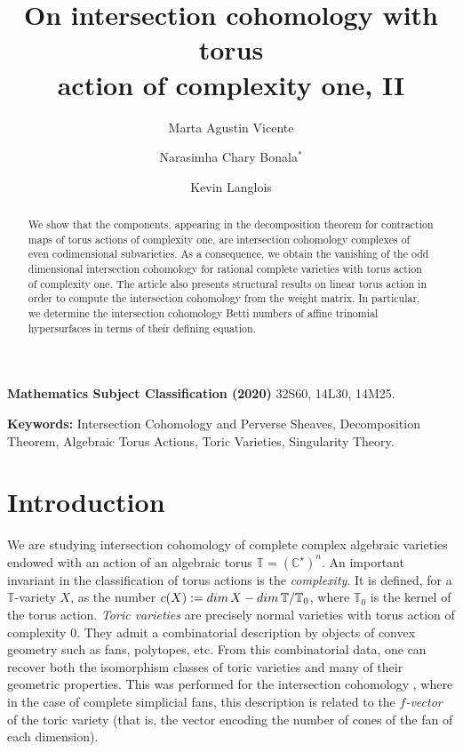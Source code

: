 \documentclass[11pt, reqno]{amsart}
\author[]{Marta Agustin Vicente}
\author[]{Narasimha Chary Bonala$^\ast$}
\author[]{Kevin Langlois}
\title []%
{On intersection cohomology with torus \\  action of complexity one, II}
\theoremstyle{plain}
\theoremstyle{definition}
\theoremstyle{remark}
\begin{document}
\begin{abstract}
We show that the components, appearing in the decomposition theorem for contraction maps of torus actions of complexity one, are intersection cohomology complexes  of even codimensional subvarieties.
 As a consequence, we obtain the vanishing of the odd dimensional intersection cohomology for rational complete varieties with torus action of complexity one. The article also presents structural results on linear torus action in order to
 compute the intersection cohomology from the weight matrix. In particular, we determine the intersection cohomology Betti numbers of affine trinomial hypersurfaces in terms of their defining equation. 
\end{abstract}  

\maketitle

{\bf Mathematics Subject Classification (2020) } 32S60, 14L30, 14M25.

\vspace{0.5cm}

{\bf Keywords:} Intersection Cohomology and Perverse Sheaves, Decomposition Theorem, Algebraic Torus Actions, Toric Varieties, Singularity Theory.

\section{Introduction}
We are studying  intersection cohomology of complete complex algebraic varieties endowed with an action
of an algebraic torus $\mathbb{T} =  (\mathbb{C}^{\star})^{n}$. An important invariant in the classification of torus actions is the \emph{complexity}. It is defined, for a $\mathbb{T}$-variety $X$, as the number $c(X):= {\rm dim}\, X -  {\rm dim}\, \mathbb{T}/\mathbb{T}_{0}$, where $\mathbb{T}_{0}$ is the kernel of the torus action. \emph{Toric varieties} are precisely normal varieties with torus action of complexity $0$. They admit a combinatorial description by objects of convex geometry such as fans, polytopes, etc.  
From this combinatorial data, one can recover both the isomorphism classes of toric varieties and many of their geometric properties.
This was performed for the intersection cohomology \cite{Sta87,  DL91, Fie91, BBFK99, BM99, BBFK02, CMM18}, where in the case of complete simplicial fans, this description is related to the \emph{$f$-vector} of the toric variety (that is, the vector encoding the number of cones of the fan of each dimension).
\end{document}
